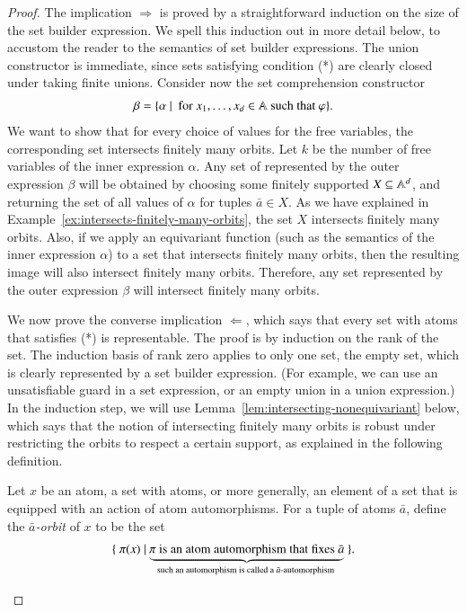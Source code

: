 \begin{proof}
The  implication $\Rightarrow$ is proved by a straightforward induction on the size of the set builder expression. We spell this induction out in more detail below, to accustom the reader to the semantics of set builder expressions. The union constructor is immediate, since sets satisfying condition (*) are clearly closed  under taking finite unions. Consider now the set comprehension constructor  
	\begin{align*}
		\beta = \{\alpha\ |\ \text{ for } x_1,\ldots,x_d \in \mathbb A \text{ such that } \varphi\}.
	\end{align*}	We want to show that for every choice of values for the free variables, the corresponding set intersects finitely many orbits.  Let $k$ be the  number of free variables of the inner expression $\alpha$. Any set of represented by the outer expression $\beta$ will be obtained by choosing some finitely supported $X \subseteq \mathbb A^d$, and returning the set of all values of $\alpha$ for tuples $\bar a \in X$. As we have explained in Example~\ref{ex:intersects-finitely-many-orbits}, the set $X$ intersects finitely many orbits. Also, if we apply an equivariant function (such as the semantics of the inner expression $\alpha$) to a set that intersects finitely many orbits, then the resulting image will also intersect finitely many orbits. Therefore, any set represented by the outer expression $\beta$ will intersect finitely many orbits.

	We now prove the converse implication $\Leftarrow$, which says that every set with atoms that satisfies (*) is representable.  The proof is by induction on the rank of the set. The induction basis of rank zero applies to only one set, the empty set, which is clearly represented by a set builder expression. (For example, we can use an unsatisfiable guard in a set expression, or an empty union in a union expression.)  In the induction step, we will use Lemma~\ref{lem:intersecting-nonequivariant} below, which says that the notion of intersecting finitely many orbits is robust under restricting the orbits to respect a certain support, as explained in the following definition. 
	
	\begin{definition}
	\label{def:bar-a-orbit}
	    Let $x$ be an atom, a set with atoms, or more generally, an element of a set that is equipped with an action of atom automorphisms. 
		For a tuple of atoms $\bar a$, define the \emph{$\bar a$-orbit} of  $x$ to be the set 
	\begin{align*}
	\setbuildoneline{ \pi(x)}{$\myunderbrace{\text{$\pi$ is an atom automorphism that fixes $\bar a$}}{such an automorphism is called a $\bar a$-automorphism}$}.
	\end{align*}
	\end{definition}


\end{proof}
